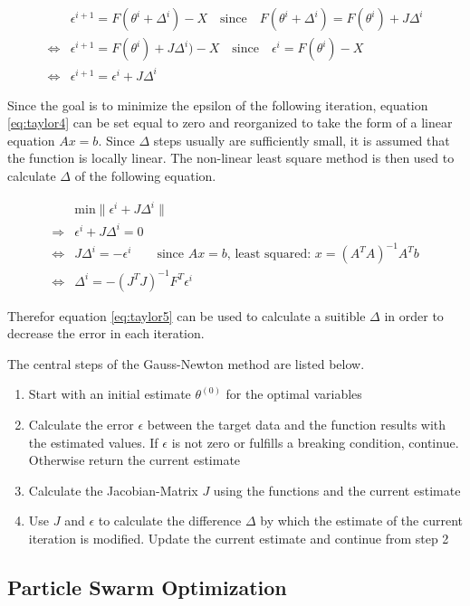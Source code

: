 \begin{align}
	& \epsilon^{i+1} = F(\theta^{i} + \Delta^{i}) - X \quad \text{since} \quad F(\theta^{i} + \Delta^{i}) = F(\theta^{i}) + J \Delta^{i} \\
	\Leftrightarrow & \epsilon^{i+1} = F(\theta^{i}) + J \Delta^{i}) - X \quad \text{since} \quad \epsilon^{i} = F(\theta^{i}) - X \\
	\Leftrightarrow & \epsilon^{i+1} = \epsilon^{i} + J \Delta^{i} \label{eq:taylor4}
\end{align}

Since the goal is to minimize the epsilon of the following iteration, equation \ref*{eq:taylor4} can be set equal to zero and reorganized to
take the form of a linear equation $Ax = b$. Since $\Delta$ steps usually are sufficiently small, it is assumed that the function is locally
linear. The non-linear least square method is then used to calculate $\Delta$ of the following equation.

\begin{align}
	&\text{min} \| \epsilon^{i} + J \Delta^{i} \| \\
	\Rightarrow & \epsilon^{i} + J \Delta^{i} = 0 \\
	\Leftrightarrow & J \Delta^{i} = -\epsilon^{i} \qquad \text{since $Ax = b$, least squared: } x = (A^T A)^{-1} A^T b \\
	\Leftrightarrow & \Delta^{i} = - (J^T J)^{-1} F^T \epsilon^{i} \label{eq:taylor5}
\end{align}

Therefor equation \ref*{eq:taylor5} can be used to calculate a suitible $\Delta$ in order to decrease the error in each iteration. \newline

The central steps of the Gauss-Newton method are listed below.
\begin{enumerate}
	\item Start with an initial estimate $\theta^{(0)}$ for the optimal variables
	\item Calculate the error $\epsilon$ between the target data and the function results with the estimated values. If $\epsilon$
		is not zero or fulfills a breaking condition, continue. Otherwise return the current estimate 
	\item Calculate the Jacobian-Matrix $J$ using the functions and the current estimate
	\item Use $J$ and $\epsilon$ to calculate the difference $\Delta$ by which the estimate of the current iteration is
		modified. Update the current estimate and continue from step 2
\end{enumerate}



\subsection{Particle Swarm Optimization}
\label{sec:PSO}



